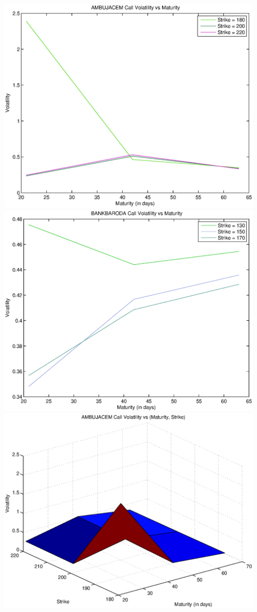 \documentclass{article}
\begin{document}
\includegraphics[width=\textwidth]{AMBUJACEM_Call_Volatility_vs_Maturity} \\               
\includegraphics[width=\textwidth]{BANKBARODA_Call_Volatility_vs_Maturity} \\
\includegraphics[width=\textwidth]{AMBUJACEM_Call_Volatility_vs_(Maturity,_Strike)} \\     
\end{document}

